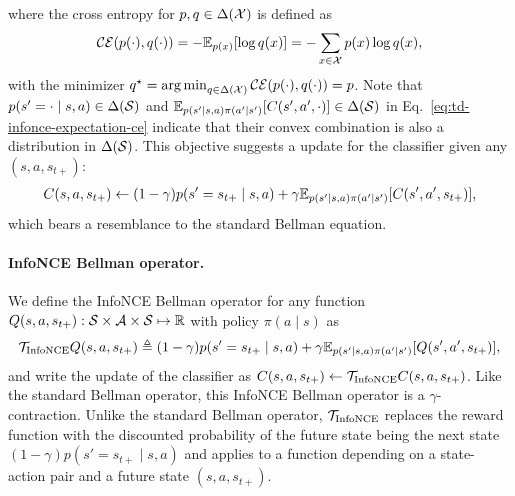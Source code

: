 \documentclass{article} %
\newcommand{\CE}{\mathcal{CE}}
\begin{document}
where the cross entropy for $p, q \in \Delta({\mathcal{X}})$ is defined as 
\begin{align*}
    \CE(p(\cdot), q(\cdot)) = - \E_{p(x)}[\log q(x)] = - \sum_{x \in \gX} p(x) \log q(x),
\end{align*}
with the minimizer $q^{\star} = \argmin_{q \in \Delta(\gX)} \CE(p(\cdot), q(\cdot)) = p$. Note that $p(s' = \cdot \mid s, a) \in \Delta({\mathcal{S}})$ and $\mathbb{E}_{p(s' \mid s, a)\pi(a' \mid s')}[C(s', a', \cdot)] \in \Delta({\mathcal{S}})$ in Eq.~\ref{eq:td-infonce-expectation-ce} indicate that their convex combination is also a distribution in $\Delta({\mathcal{S}})$. This objective suggests a update for the classifier given any $(s, a, s_{t+})$:
\begin{align}
    C(s, a, s_{t+}) \gets (1 - \gamma) p(s' = s_{t+} \mid s, a) + \gamma \mathbb{E}_{p(s' \mid s, a) \pi(a' \mid s')}[C(s', a', s_{t+})],
    \label{eq:td-infonce-update}
\end{align}
which bears a resemblance to the standard Bellman equation. 

\paragraph{InfoNCE Bellman operator.} We define the InfoNCE Bellman operator for any function $Q(s, a, s_{t+}): {\mathcal{S}} \times {\mathcal{A}} \times {\mathcal{S}} \mapsto \mathbb{R}$ with policy $\pi(a \mid s)$ as 
\begin{align}
    {\mathcal{T}}_{\text{InfoNCE}} Q(s, a, s_{t+}) \triangleq (1 - \gamma) p(s' = s_{t+} \mid s, a) + \gamma \mathbb{E}_{p(s' \mid s, a) \pi(a' \mid s')}[Q(s', a', s_{t+})],
\end{align}
and write the update of the classifier as $C(s, a, s_{t+}) \gets {\mathcal{T}}_{\text{InfoNCE}} C(s, a, s_{t+})$. Like the standard Bellman operator, this InfoNCE Bellman operator is a $\gamma$-contraction. Unlike the standard Bellman operator, ${\mathcal{T}}_{\text{InfoNCE}}$ replaces the reward function with the discounted probability of the future state being the next state $(1 - \gamma) p(s' = s_{t+} \mid s, a)$ and applies to a function depending on a state-action pair and a future state $(s, a, s_{t+})$.
\end{document}
